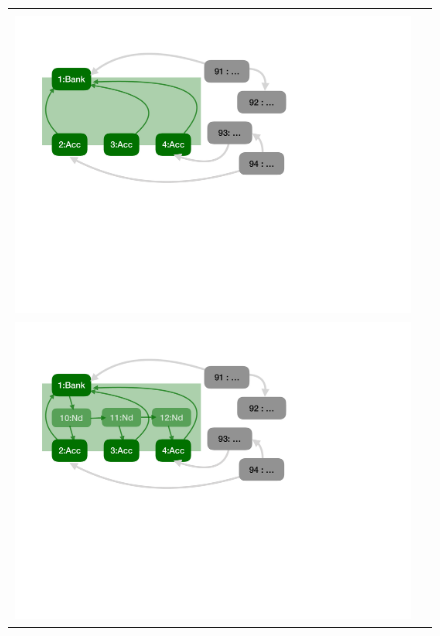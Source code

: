  
 
\begin{figure}[htbp]
\begin{center}
\begin{tabular}{cc}
 \begin{minipage}{0.45\textwidth}
$\sigma_1$\\
 \includegraphics[width=\linewidth, trim=55  330 320 60,clip]{diagrams/BankAccount_version_1.pdf}
   \end{minipage}
 &  
 \begin{minipage}{0.45\textwidth}
 $\sigma_2$\\
  \includegraphics[width=\linewidth, trim=55  330 320 60,clip]{diagrams/BankAccount_version_2.pdf}
   \end{minipage}

\end{tabular}
\end{center}
\end{figure}
